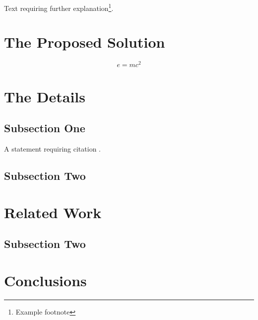 \documentclass[twoside]{article}
\begin{document}
Text requiring further explanation\footnote{Example footnote}.


\section{The Proposed Solution}

\blindtext %

\begin{equation}
\label{eq:emc}
e = mc^2
\end{equation}

\blindtext %


\section{The Details}

\subsection{Subsection One}

A statement requiring citation \cite{Figueredo:2009dg}.
\blindtext %

\subsection{Subsection Two}

\blindtext %


\section{Related Work}


\subsection{Subsection Two}

\blindtext %


\section{Conclusions}
\end{document}
